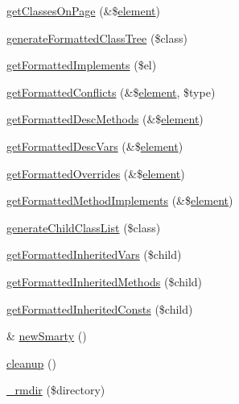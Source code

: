\begin{DoxyCompactItemize}
\item 
\hyperlink{class_converter_a6c498ee5dc5534b19b09f3a79e057e01}{get\-Classes\-On\-Page} (\&\$\hyperlink{bug-904820_8php_aa94081298ab2dfd0f261cce6c203d9aa}{element})
\item 
\hyperlink{class_converter_a694db0f7353906320d85ee37bd7e2fc5}{generate\-Formatted\-Class\-Tree} (\$class)
\item 
\hyperlink{class_converter_aa766535bb8f8830c7b355b5bc2871639}{get\-Formatted\-Implements} (\$el)
\item 
\hyperlink{class_converter_a98a524a574359a7614e4615ce723053a}{get\-Formatted\-Conflicts} (\&\$\hyperlink{bug-904820_8php_aa94081298ab2dfd0f261cce6c203d9aa}{element}, \$type)
\item 
\hyperlink{class_converter_ae9fae571653077080f17463c0ffc4df2}{get\-Formatted\-Desc\-Methods} (\&\$\hyperlink{bug-904820_8php_aa94081298ab2dfd0f261cce6c203d9aa}{element})
\item 
\hyperlink{class_converter_a35d8b5e9879dabda1308a1e3341eab26}{get\-Formatted\-Desc\-Vars} (\&\$\hyperlink{bug-904820_8php_aa94081298ab2dfd0f261cce6c203d9aa}{element})
\item 
\hyperlink{class_converter_a7dea9f3d8f290d5d068dbf0b3617ef6b}{get\-Formatted\-Overrides} (\&\$\hyperlink{bug-904820_8php_aa94081298ab2dfd0f261cce6c203d9aa}{element})
\item 
\hyperlink{class_converter_aabb15d0e3762ebe0d01fb464f8946447}{get\-Formatted\-Method\-Implements} (\&\$\hyperlink{bug-904820_8php_aa94081298ab2dfd0f261cce6c203d9aa}{element})
\item 
\hyperlink{class_converter_ae3d547d6452f75ae918c03ff383ee29f}{generate\-Child\-Class\-List} (\$class)
\item 
\hyperlink{class_converter_acd0d3b854a9c85bddc46a8e03b15bf6e}{get\-Formatted\-Inherited\-Vars} (\$child)
\item 
\hyperlink{class_converter_a5bbd09f1c8062a16db29df3b398e0894}{get\-Formatted\-Inherited\-Methods} (\$child)
\item 
\hyperlink{class_converter_a61bd9a51612f2a16988ce8c5a2ea1957}{get\-Formatted\-Inherited\-Consts} (\$child)
\item 
\& \hyperlink{class_converter_a884420563add765cb56d99b4a6eacd0c}{new\-Smarty} ()
\item 
\hyperlink{class_converter_aff07c1d29d6d6a540c726948254a1764}{cleanup} ()
\item 
\hyperlink{class_converter_abbbca0ea6e3ef62f5d4e705e3e9bc794}{\-\_\-rmdir} (\$directory)
\item 

\end{DoxyCompactItemize}
